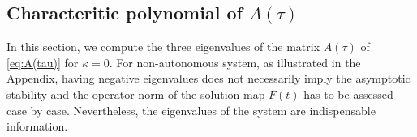 \documentclass[a4paper,11pt]{article}
\def\l{(2\pi \ell)}
\theoremstyle{remark}
\begin{document}
% 
\subsection{Characteritic polynomial of $A(\tau)$}
In this section, we compute the three eigenvalues of the matrix $A(\tau)$ of \eqref{eq:A(tau)} for $\kappa=0$. For non-autonomous system, as illustrated in the Appendix, having negative eigenvalues does not necessarily imply the asymptotic stability and the operator norm of the solution map $F(t)$ has to be assessed case by case. Nevertheless, the eigenvalues of the system are indispensable information.
\end{document}
